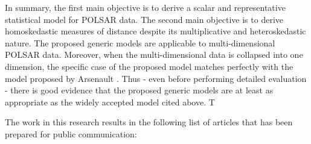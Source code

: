 In summary, the first main objective is to derive a scalar and representative statistical model for POLSAR data.
The second main objective is to derive homoskedastic measures of distance despite its multiplicative and heteroskedastic nature.
The proposed generic models are applicable to multi-dimensional POLSAR data.
Moreover, when the multi-dimensional data is collapsed into one dimension, the specific case of the proposed model matches perfectly with the model proposed by Arsenault \cite{Arsenault_JOptSocAm_1976}.
Thus - even before performing detailed evaluation - there is good evidence that the proposed generic models are at least as appropriate as the widely accepted model cited above.
T%

The work in this research results in the following list of articles that has been prepared for public communication: 

